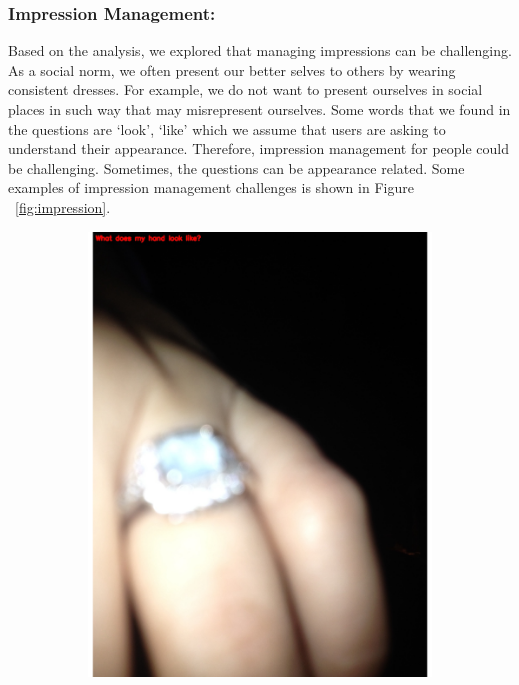 \documentclass[sigconf]{acmart}
\begin{document}
\subsubsection{Impression Management:} Based on the analysis, we explored that managing impressions can be challenging. As a social norm, we often present our better selves to others by wearing consistent dresses. For example, we do not want to present ourselves in social places in such way that may misrepresent ourselves. Some words that we found in the questions are `look', `like' which we assume that users are asking to understand their appearance. Therefore, impression management for people could be challenging. Sometimes, the questions can be appearance related. Some examples of impression management challenges is shown in Figure ~\ref{fig:impression}.
\begin{figure}[hbp]
        \centering
        \begin{subfigure}[b]{0.45\columnwidth}
                \includegraphics[scale=0.3]{images/impression_1.pdf}  

\end{subfigure}
\end{figure}
\end{document}
